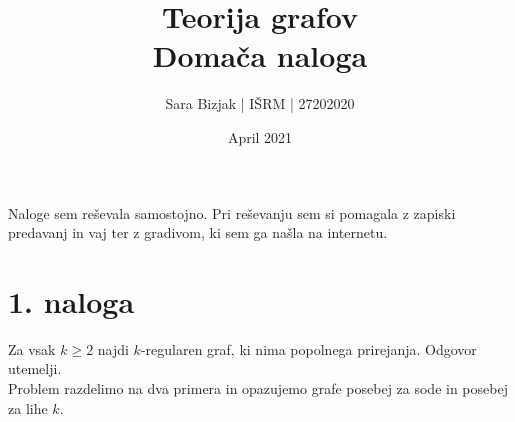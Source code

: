 \documentclass[a4paper,11pt]{article}
\title{Teorija grafov \\
\textbf{Domača naloga} }
\author{Sara Bizjak  |  IŠRM  |  27202020}
\date{April 2021}
\begin{document}
\maketitle


\noindent
Naloge sem reševala samostojno.
Pri reševanju sem si pomagala z zapiski predavanj in vaj ter z gradivom, ki sem ga našla na internetu.

\section*{1. naloga}
Za vsak $k \geq 2$ najdi $k$-regularen graf, ki nima popolnega prirejanja. Odgovor utemelji.
\\

\noindent
Problem razdelimo na dva primera in opazujemo grafe posebej za sode in posebej za lihe $k$.
\\
\end{document}
